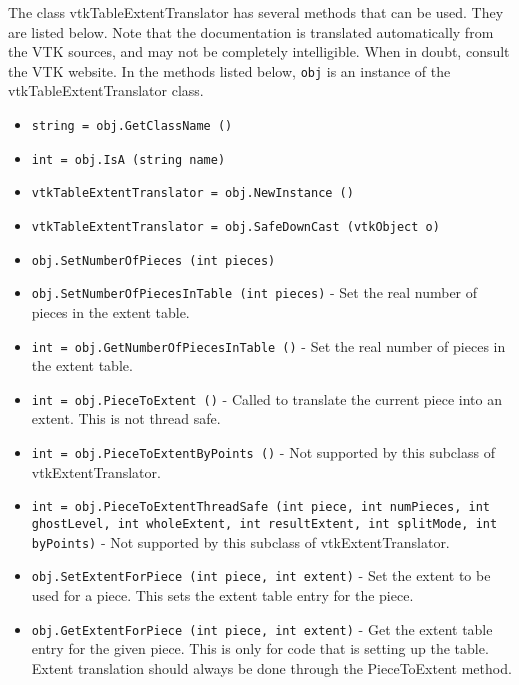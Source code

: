 The class vtkTableExtentTranslator has several methods that can be used.
  They are listed below.
Note that the documentation is translated automatically from the VTK sources,
and may not be completely intelligible.  When in doubt, consult the VTK website.
In the methods listed below, \verb|obj| is an instance of the vtkTableExtentTranslator class.
\begin{itemize}
\item  \verb|string = obj.GetClassName ()|

\item  \verb|int = obj.IsA (string name)|

\item  \verb|vtkTableExtentTranslator = obj.NewInstance ()|

\item  \verb|vtkTableExtentTranslator = obj.SafeDownCast (vtkObject o)|

\item  \verb|obj.SetNumberOfPieces (int pieces)|

\item  \verb|obj.SetNumberOfPiecesInTable (int pieces)| -  Set the real number of pieces in the extent table.

\item  \verb|int = obj.GetNumberOfPiecesInTable ()| -  Set the real number of pieces in the extent table.

\item  \verb|int = obj.PieceToExtent ()| -  Called to translate the current piece into an extent.  This is
 not thread safe.

\item  \verb|int = obj.PieceToExtentByPoints ()| -  Not supported by this subclass of vtkExtentTranslator.

\item  \verb|int = obj.PieceToExtentThreadSafe (int piece, int numPieces, int ghostLevel, int wholeExtent, int resultExtent, int splitMode, int byPoints)| -  Not supported by this subclass of vtkExtentTranslator.

\item  \verb|obj.SetExtentForPiece (int piece, int extent)| -  Set the extent to be used for a piece.  This sets the extent table
 entry for the piece.

\item  \verb|obj.GetExtentForPiece (int piece, int extent)| -  Get the extent table entry for the given piece.  This is only for
 code that is setting up the table.  Extent translation should
 always be done through the PieceToExtent method.


\end{itemize}
